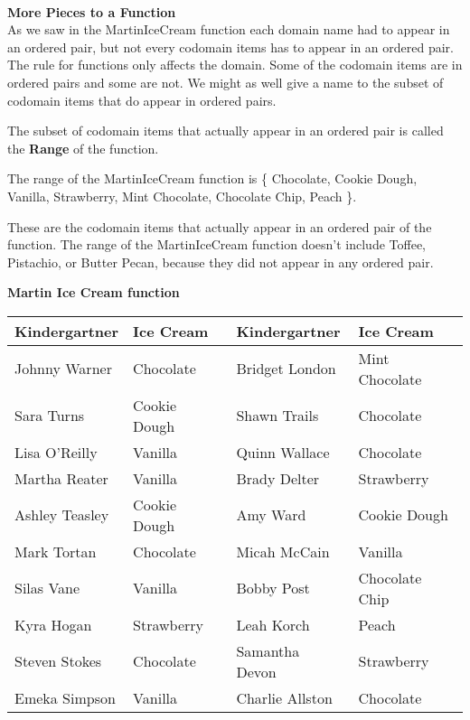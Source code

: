 \documentclass{ximera}
\begin{document}
\quad \\

\textbf{More Pieces to a Function} \\

As we saw in the MartinIceCream function each domain name had to appear in an ordered pair, but not every codomain items has to appear in an ordered pair. The rule for functions only affects the domain. Some of the codomain items are in ordered pairs and some are not. We might as well give a name to the subset of codomain items that do appear in ordered pairs.

\begin{definition}
The subset of codomain items that actually appear in an ordered pair is called the \textbf{Range} of the function.
\end{definition}


\begin{example}
The range of the MartinIceCream function is 
\{ Chocolate, Cookie Dough, Vanilla, Strawberry, Mint Chocolate, Chocolate Chip, Peach \}.

These are the codomain items that actually appear in an ordered pair of the function.  The range of the MartinIceCream function doesn't include Toffee, Pistachio, or Butter Pecan, because they did not appear in any ordered pair.
\end{example}




\textbf{Martin Ice Cream function} \\
\begin{center}

\begin{tabular}{|l|l|l|l|}
\hline
Kindergartner & Ice Cream & Kindergartner & Ice Cream \\\hline 
Johnny Warner & Chocolate & Bridget London & Mint Chocolate \\\hline 
Sara Turns & Cookie Dough & Shawn Trails & Chocolate \\\hline 
Lisa O'Reilly & Vanilla & Quinn Wallace & Chocolate \\\hline 
Martha Reater & Vanilla & Brady Delter & Strawberry \\\hline 
Ashley Teasley & Cookie Dough & Amy Ward & Cookie Dough \\\hline 
Mark Tortan & Chocolate & Micah McCain & Vanilla \\\hline 
Silas Vane & Vanilla & Bobby Post & Chocolate Chip \\\hline 
Kyra Hogan & Strawberry & Leah Korch & Peach \\\hline 
Steven Stokes & Chocolate & Samantha Devon & Strawberry \\\hline 
Emeka Simpson & Vanilla & Charlie Allston & Chocolate \\\hline 
\end{tabular}

\end{center}
\end{document}
